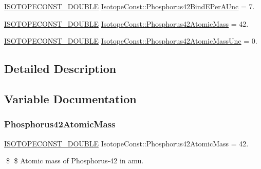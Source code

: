 \begin{DoxyCompactItemize}
\mbox{\hyperlink{group___isotope_const-_macros_ga8f45a7272ce02c0b4c65c44636ed719a}{I\+S\+O\+T\+O\+P\+E\+C\+O\+N\+S\+T\+\_\+\+D\+O\+U\+B\+LE}} \mbox{\hyperlink{group___isotope_const-_phosphorus-_p42_ga8cc1dcb79cdb28c2fc63c7eb8a61185d}{Isotope\+Const\+::\+Phosphorus42\+Bind\+E\+Per\+A\+Unc}} = 7.
\item 
\mbox{\hyperlink{group___isotope_const-_macros_ga8f45a7272ce02c0b4c65c44636ed719a}{I\+S\+O\+T\+O\+P\+E\+C\+O\+N\+S\+T\+\_\+\+D\+O\+U\+B\+LE}} \mbox{\hyperlink{group___isotope_const-_phosphorus-_p42_gad325718816ee37511fb77e1c4822caf9}{Isotope\+Const\+::\+Phosphorus42\+Atomic\+Mass}} = 42.
\item 
\mbox{\hyperlink{group___isotope_const-_macros_ga8f45a7272ce02c0b4c65c44636ed719a}{I\+S\+O\+T\+O\+P\+E\+C\+O\+N\+S\+T\+\_\+\+D\+O\+U\+B\+LE}} \mbox{\hyperlink{group___isotope_const-_phosphorus-_p42_ga04516e575b28f98edfe9c8b06b777828}{Isotope\+Const\+::\+Phosphorus42\+Atomic\+Mass\+Unc}} = 0.
\end{DoxyCompactItemize}


\subsection{Detailed Description}


\subsection{Variable Documentation}
\mbox{\label{group___isotope_const-_phosphorus-_p42_gad325718816ee37511fb77e1c4822caf9}} 
\subsubsection{\texorpdfstring{Phosphorus42\+Atomic\+Mass}{Phosphorus42AtomicMass}}
{\footnotesize\ttfamily \mbox{\hyperlink{group___isotope_const-_macros_ga8f45a7272ce02c0b4c65c44636ed719a}{I\+S\+O\+T\+O\+P\+E\+C\+O\+N\+S\+T\+\_\+\+D\+O\+U\+B\+LE}} Isotope\+Const\+::\+Phosphorus42\+Atomic\+Mass = 42.}

\$ \$ Atomic mass of Phosphorus-\/42 in amu. \mbox{\label{group___isotope_const-_phosphorus-_p42_ga04516e575b28f98edfe9c8b06b777828}} 
